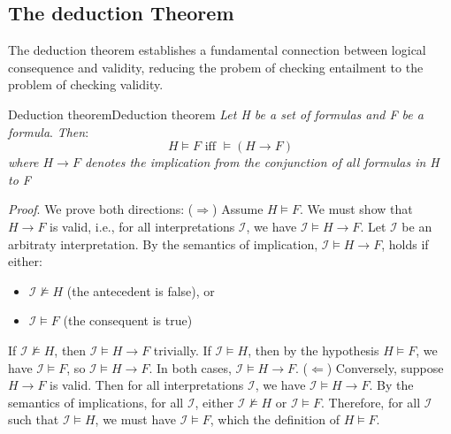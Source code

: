 \documentclass[a4paper]{article}
\theoremstyle{definition}
\begin{document}
\subsection{The deduction Theorem}
The deduction theorem establishes a fundamental connection between logical consequence and validity, reducing the probem of checking entailment 
to the problem of checking validity.
\begin{definition}{Deduction theorem}{Deduction theorem}
\textit{Let H be a set of formulas and F be a formula}.
\newline
\textit{Then}:
\[
  H \models F \text{ iff } \models (H \rightarrow F)
\]
\textit{where \( H \rightarrow F \) denotes the implication from the conjunction of all formulas in H to F}
\end{definition}
\textit{Proof}. We prove both directions:
\newline
(\( \Rightarrow \)) Assume \( H \models F \). We must show that \( H \rightarrow F \) is valid, i.e., for all interpretations \( \mathcal{I} \), we have 
\( \mathcal{I} \models H \rightarrow F \).
\vspace{1em}
\noindent
\newline
Let \( \mathcal{I} \) be an arbitraty interpretation. By the semantics of implication, \( \mathcal{I} \models H \rightarrow F \), holds if 
either:
\begin{itemize}
	\item \( \mathcal{I} \nvDash H \) (the antecedent is false), or 
	\item \( \mathcal{I} \models F \) (the consequent is true)
\end{itemize}
If \( \mathcal{I} \nvDash H \), then \( \mathcal{I} \models H \rightarrow F \) trivially. If \( \mathcal{I} \models H \), then by the hypothesis
\( H \models F \), we have \( \mathcal{I} \models F \), so \( \mathcal{I} \models H \rightarrow F \). In both cases, \( \mathcal{I} \models H \rightarrow F \).
\vspace{1em}
\noindent
\newline
(\( \Leftarrow \)) Conversely, suppose \( H \rightarrow F \) is valid. Then for all interpretations \( \mathcal{I} \), we have \( \mathcal{I} \models H \rightarrow F \).
By the semantics of implications, for all \( \mathcal{I} \), either \( \mathcal{I} \nvDash H \) or \( \mathcal{I} \models F \). Therefore, for all 
\( \mathcal{I} \) such that \( \mathcal{I} \models H \), we must have \( \mathcal{I} \models F \), which the definition of \( H \models F \).
\end{document}
